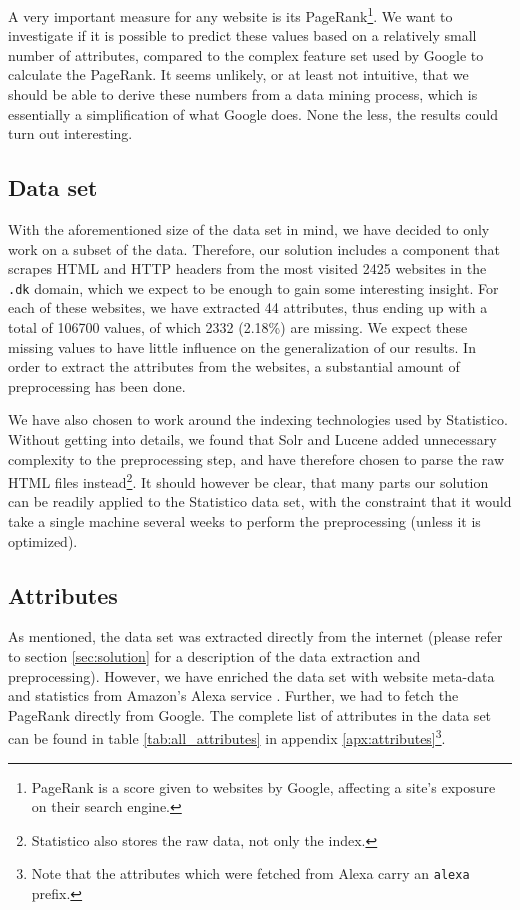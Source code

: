 A very important measure for any website is its PageRank\footnote{PageRank is a score given to websites by Google, affecting a site's exposure on their search engine.}. We want to investigate if it is possible to predict these values based on a relatively small number of attributes, compared to the complex feature set used by Google to calculate the PageRank. It seems unlikely, or at least not intuitive, that we should be able to derive these numbers from a data mining process, which is essentially a simplification of what Google does. None the less, the results could turn out interesting.

\subsection{Data set}
\label{subsec:data_set}

With the aforementioned size of the data set in mind, we have decided to only work on a subset of the data. Therefore, our solution includes a component that scrapes HTML and HTTP headers from the most visited 2425 websites in the \texttt{.dk} domain, which we expect to be enough to gain some interesting insight. For each of these websites, we have extracted 44 attributes, thus ending up with a total of 106700 values, of which 2332 (2.18\%) are missing. We expect these missing values to have little influence on the generalization of our results. In order to extract the attributes from the websites, a substantial amount of preprocessing has been done. 

We have also chosen to work around the indexing technologies used by Statistico. Without getting into details, we found that Solr and {Lucene} added unnecessary complexity to the preprocessing step, and have therefore chosen to parse the raw {HTML} files instead\footnote{Statistico also stores the raw data, not only the index.}. It should however be clear, that many parts our solution can be readily applied to the Statistico data set, with the constraint that it would take a single machine several weeks to perform the preprocessing (unless it is optimized).

\subsection{Attributes}
\label{subsec:attributes}

As mentioned, the data set was extracted directly from the internet (please refer to section \ref{sec:solution} for a description of the data extraction and preprocessing). However, we have enriched the data set with website meta-data and statistics from Amazon's Alexa service \cite{alexa}. Further, we had to fetch the PageRank directly from Google. The complete list of attributes in the data set can be found in table \ref{tab:all_attributes} in appendix \ref{apx:attributes}\footnote{Note that the attributes which were fetched from Alexa carry an \texttt{alexa} prefix.}.

